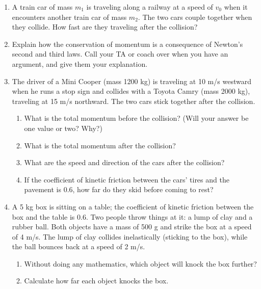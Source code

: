 \documentclass[12pt]{article}
\begin{document}
\Large
\centerline{}

\normalsize
\centerline{}

\begin{enumerate}

\item A train car of mass $m_1$ is traveling along a railway at a speed of $v_0$ when it encounters another train car of mass $m_2$. The two cars couple together when
they collide. How fast are they traveling after the collision?

\vspace{2in}

\item Explain how the conservation of momentum is a consequence of Newton's second and third laws. Call your TA or coach over when you have an argument, and give them 
your explanation.

  \item{The driver of a Mini Cooper (mass 1200 kg) is traveling at 10 m/s westward when he runs a stop sign and collides with a Toyota Camry (mass 2000 kg), traveling at 15 m/s northward. The two cars stick together after the collision.} 
      \begin{enumerate}
    \item What is the total momentum before the collision? (Will your answer be one value or two? Why?)

\vspace{2in}

    \item What is the total momentum after the collision?

\newpage


    \item{What are the speed and direction of the cars after the collision?}

\vspace{3in}

    \item{If the coefficient of kinetic friction between the cars' tires and the pavement is 0.6, how far do they skid before coming to rest?}

  \end{enumerate}

\newpage

\item{A 5 kg box is sitting on a table; the coefficient of kinetic friction between the box and the table is 0.6.
  Two people throw things at it: a lump of clay and a rubber ball. Both objects have a mass of 500 g and strike the box at a speed of 4 m/s. The lump of clay collides inelastically (sticking to the box), while the ball bounces back at a speed of 2 m/s.}
  \begin{enumerate}
    \item{Without doing any mathematics, which object will knock the box further?}
\vspace{1in}
    \item{Calculate how far each object knocks the box.}
  \end{enumerate}
  \end{enumerate}

   
\end{document}

